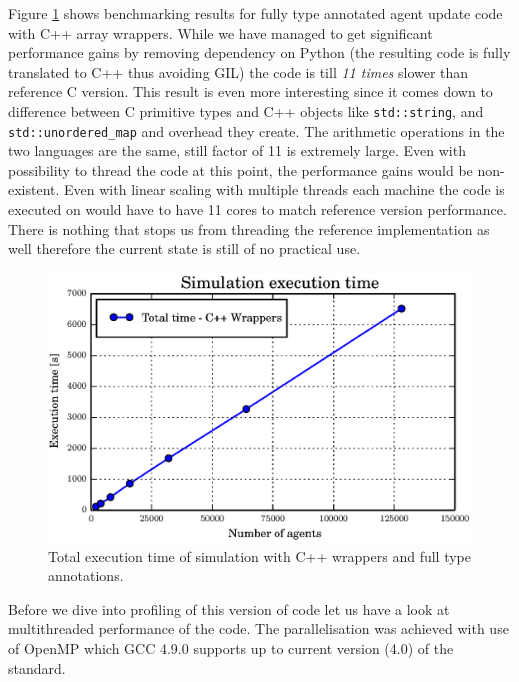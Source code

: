 \documentclass[12pt, a4paper]{report}
\begin{document}
Figure \ref{fig:gil-free-perf} shows benchmarking results for fully type annotated agent update
code with C++ array wrappers. While we have managed to get significant performance gains by
removing dependency on Python (the resulting code is fully translated to C++ thus avoiding GIL) the
code is till \emph{11 times} slower than reference C version. This result is even more interesting
since it comes down to difference between C primitive types and C++ objects like \lstinline{std::string},
and \lstinline{std::unordered_map} and overhead they create. The arithmetic operations in the two
languages are the same, still factor of 11 is extremely large. Even with possibility to thread
the code at this point, the performance gains would be non-existent. Even with linear scaling
with multiple threads each machine the code is executed on would have to have 11 cores to match
reference version performance. There is nothing that stops us from threading the reference
implementation as well therefore the current state is still of no practical use.

\begin{figure}[H]
  \begin{center}
    \includegraphics[width=\columnwidth]{graphs/gil-free-perf.eps}
    \caption{Total execution time of simulation with C++ wrappers and full type annotations.}
    \label{fig:gil-free-perf}
  \end{center}
\end{figure}

Before we dive into profiling of this version of code let us have a look at multithreaded
performance of the code. The parallelisation was achieved with use of OpenMP which GCC 4.9.0
supports up to current version (4.0) of the standard.
\end{document}
